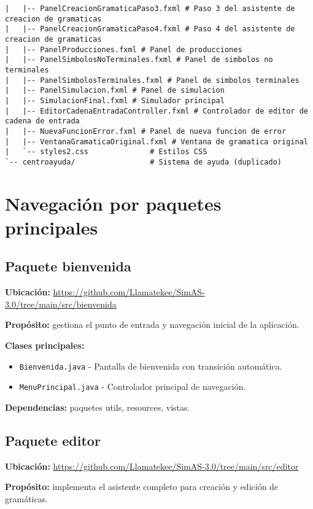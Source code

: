 \begin{lstlisting}[caption=Estructura del código fuente]
|   |-- PanelCreacionGramaticaPaso3.fxml # Paso 3 del asistente de creacion de gramaticas   
|   |-- PanelCreacionGramaticaPaso4.fxml # Paso 4 del asistente de creacion de gramaticas
|   |-- PanelProducciones.fxml # Panel de producciones
|   |-- PanelSimbolosNoTerminales.fxml # Panel de simbolos no terminales
|   |-- PanelSimbolosTerminales.fxml # Panel de simbolos terminales
|   |-- PanelSimulacion.fxml # Panel de simulacion
|   |-- SimulacionFinal.fxml # Simulador principal
|   |-- EditorCadenaEntradaController.fxml # Controlador de editor de cadena de entrada
|   |-- NuevaFuncionError.fxml # Panel de nueva funcion de error
|   |-- VentanaGramaticaOriginal.fxml # Ventana de gramatica original
|   `-- styles2.css              # Estilos CSS
`-- centroayuda/                 # Sistema de ayuda (duplicado)
\end{lstlisting}

\section{Navegación por paquetes principales}

\subsection{Paquete bienvenida}

\textbf{Ubicación:} \url{https://github.com/Llamatekee/SimAS-3.0/tree/main/src/bienvenida}

\textbf{Propósito:} gestiona el punto de entrada y navegación inicial de la aplicación.

\textbf{Clases principales:}
\begin{itemize}
    \item \texttt{Bienvenida.java} - Pantalla de bienvenida con transición automática.
    \item \texttt{MenuPrincipal.java} - Controlador principal de navegación.
\end{itemize}

\textbf{Dependencias:} paquetes utils, resources, vistas.

\subsection{Paquete editor}

\textbf{Ubicación:} \url{https://github.com/Llamatekee/SimAS-3.0/tree/main/src/editor}

\textbf{Propósito:} implementa el asistente completo para creación y edición de gramáticas.

